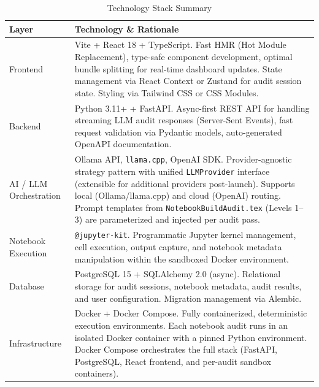 \documentclass[11pt, a4paper]{article}
\begin{document}
\begin{table}[H]
  \centering
  \caption{Technology Stack Summary}
  \label{tab:techstack}
  \renewcommand{\arraystretch}{1.4}
  \begin{tabularx}{\textwidth}{l Y}
    \toprule
    \textbf{Layer} & \textbf{Technology \& Rationale} \\
    \midrule
    Frontend &
    Vite + React 18 + TypeScript. Fast HMR (Hot Module Replacement), type-safe
    component development, optimal bundle splitting for real-time dashboard updates.
    State management via React Context or Zustand for audit session state. Styling
    via Tailwind CSS or CSS Modules. \\

    Backend &
    Python 3.11+ + FastAPI. Async-first REST API for handling streaming LLM audit
    responses (Server-Sent Events), fast request validation via Pydantic models,
    auto-generated OpenAPI documentation. \\

    AI / LLM Orchestration &
    Ollama API, \texttt{llama.cpp}, OpenAI SDK.
    Provider-agnostic strategy pattern with unified \texttt{LLMProvider} interface
    (extensible for additional providers post-launch).
    Supports local (Ollama/llama.cpp) and cloud (OpenAI)
    routing. Prompt templates from \texttt{NotebookBuildAudit.tex} (Levels 1--3)
    are parameterized and injected per audit pass. \\

    Notebook Execution &
    \texttt{@jupyter-kit}. Programmatic Jupyter kernel management, cell execution,
    output capture, and notebook metadata manipulation within the sandboxed Docker
    environment. \\

    Database &
    PostgreSQL 15 + SQLAlchemy 2.0 (async). Relational storage for audit sessions,
    notebook metadata, audit results, and user configuration. Migration management
    via Alembic. \\

    Infrastructure &
    Docker + Docker Compose. Fully containerized, deterministic execution
    environments. Each notebook audit runs in an isolated Docker container with a
    pinned Python environment. Docker Compose orchestrates the full stack (FastAPI,
    PostgreSQL, React frontend, and per-audit sandbox containers). \\

    \bottomrule
  \end{tabularx}
\end{table}
\end{document}
